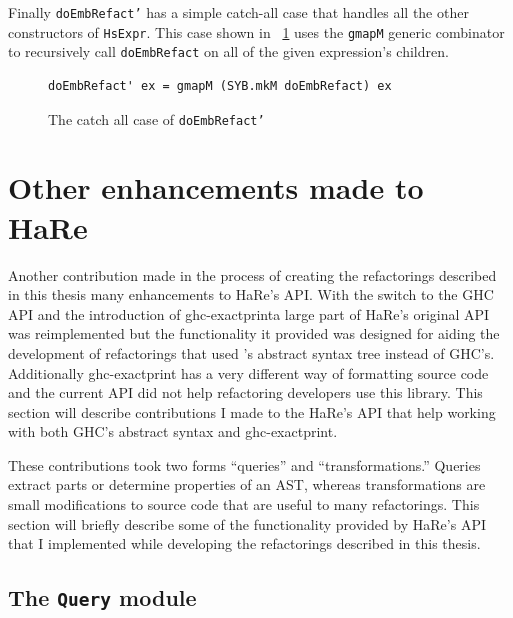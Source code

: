 Finally \texttt{doEmbRefact'} has a simple catch-all case that handles all the other constructors of \texttt{HsExpr}. This case shown in \DIFdelbegin {}\DIFdelend \DIFaddbegin {}\DIFaddend ~\ref{doEmbCatchAll} uses the \texttt{gmapM} generic combinator to recursively call \texttt{doEmbRefact} on all of the given expression's children. 

\begin{figure}[t]
\begin{lstlisting}
doEmbRefact' ex = gmapM (SYB.mkM doEmbRefact) ex
\end{lstlisting}
\caption{The catch all case of \texttt{doEmbRefact'}}
\label{doEmbCatchAll}
\end{figure}

\section{Other enhancements made to HaRe}
\label{hareAPI}

Another contribution \DIFdelbegin {}\DIFdelend made in the process of creating the refactorings described in this thesis \DIFdelbegin {}\DIFdelend \DIFaddbegin {}\DIFaddend many enhancements to HaRe's API. With the switch to the GHC API and the introduction of ghc-exactprint\DIFaddbegin \DIFadd{, }\DIFaddend a large part of HaRe's original API was reimplemented but the functionality it provided was designed for aiding the development of refactorings that used \DIFdelbegin {}\DIFdelend \DIFaddbegin {}\DIFaddend 's abstract syntax tree instead of GHC's. Additionally ghc-exactprint has a very different way of formatting source code and the current API did not help refactoring developers use this library. This section will describe contributions I made to the HaRe's API that help working with both GHC's abstract syntax and ghc-exactprint.

These contributions took two forms ``queries'' and ``transformations.'' Queries extract parts or determine properties of an AST, whereas transformations are small modifications to source code that are useful to many refactorings. This section will briefly describe some of the functionality provided by HaRe's API that I implemented while developing the refactorings described in this thesis. 

\subsection{The \texttt{Query} module}


